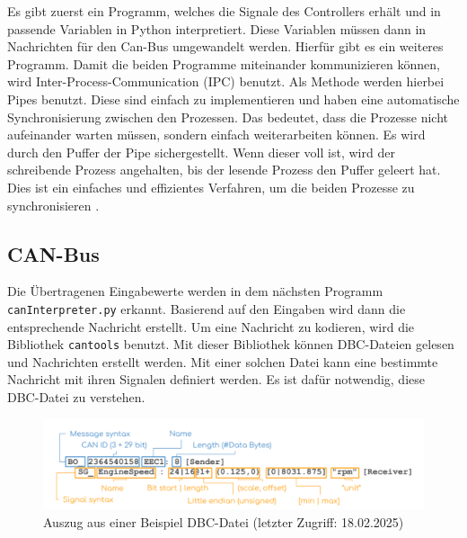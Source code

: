 Es gibt zuerst ein Programm, welches die Signale des Controllers erhält und in passende Variablen in Python interpretiert. Diese Variablen müssen
dann in Nachrichten für den Can-Bus umgewandelt werden. Hierfür gibt es ein weiteres Programm. Damit die beiden Programme miteinander kommunizieren
können, wird Inter-Process-Communication (IPC) benutzt. Als Methode werden hierbei Pipes benutzt. Diese sind einfach zu implementieren und haben
eine automatische Synchronisierung zwischen den Prozessen. Das bedeutet, dass die Prozesse nicht aufeinander warten müssen, sondern einfach
weiterarbeiten können. Es wird durch den Puffer der Pipe sichergestellt. Wenn dieser voll ist, wird der schreibende Prozess angehalten, bis der
lesende Prozess den Puffer geleert hat. Dies ist ein einfaches und effizientes Verfahren, 
um die beiden Prozesse zu synchronisieren \cite{Venkataraman2015}. 

\subsection{CAN-Bus}
Die Übertragenen Eingabewerte werden in dem nächsten Programm \texttt{canInterpreter.py} erkannt. Basierend auf den
Eingaben wird dann die entsprechende Nachricht erstellt. Um eine Nachricht zu kodieren, wird die Bibliothek \texttt{cantools} benutzt.
Mit dieser Bibliothek können DBC-Dateien gelesen und Nachrichten erstellt werden. Mit einer solchen Datei kann eine
bestimmte Nachricht mit ihren Signalen definiert werden. Es ist dafür notwendig, diese DBC-Datei zu verstehen.
\begin{figure}[H]
    \centering
    \includegraphics[scale=0.2]{images/CAN-DBC-File-Format-Explained-Intro-Basics_2.png}
    \caption{Auszug aus einer Beispiel DBC-Datei \cite{cssElectronics}(letzter Zugriff: 18.02.2025)}
    \label{fig:dbcfile}
\end{figure}

